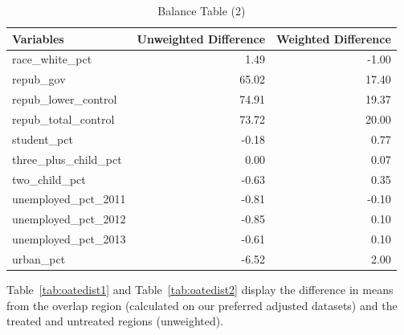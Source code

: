 \documentclass[12pt]{article}
\begin{document}
\begin{table}[ht]
\begin{tabular}{lrr}
  \toprule
Variables & Unweighted Difference & Weighted Difference \\ 
  \midrule
  race\_white\_pct & 1.49 & -1.00 \\ 
  repub\_gov & 65.02 & 17.40 \\ 
  repub\_lower\_control & 74.91 & 19.37 \\ 
  repub\_total\_control & 73.72 & 20.00 \\ 
  student\_pct & -0.18 & 0.77 \\ 
  three\_plus\_child\_pct & 0.00 & 0.07 \\ 
  two\_child\_pct & -0.63 & 0.35 \\ 
  unemployed\_pct\_2011 & -0.81 & -0.10 \\ 
  unemployed\_pct\_2012 & -0.85 & 0.10 \\ 
  unemployed\_pct\_2013 & -0.61 & 0.10 \\ 
  urban\_pct & -6.52 & 2.00 \\ 
   \bottomrule
    \end{tabular}
    \caption{Balance Table (2)}
    \label{tab:baltab2}
\end{table}

Table~\ref{tab:oatedist1} and Table~\ref{tab:oatedist2} display the difference in means from the overlap region (calculated on our preferred adjusted datasets) and the treated and untreated regions (unweighted). 
\end{document}
